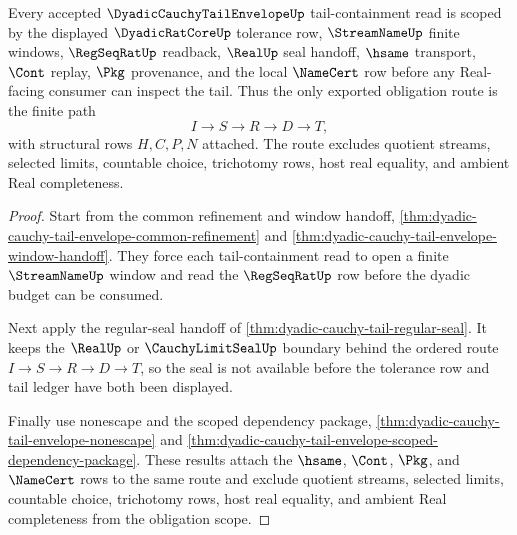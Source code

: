 \begin{theorem}
\label{thm:dyadic-cauchy-tail-obligation-scope}
Every accepted $\DyadicCauchyTailEnvelopeUp$ tail-containment read is scoped by the displayed $\DyadicRatCoreUp$ tolerance row, $\StreamNameUp$ finite windows, $\RegSeqRatUp$ readback, $\RealUp$ seal handoff, $\hsame$ transport, $\Cont$ replay, $\Pkg$ provenance, and the local $\NameCert$ row before any Real-facing consumer can inspect the tail. Thus the only exported obligation route is the finite path
$$
I \longrightarrow S \longrightarrow R \longrightarrow D \longrightarrow T ,
$$
with structural rows $H,C,P,N$ attached. The route excludes quotient streams, selected limits, countable choice, trichotomy rows, host real equality, and ambient Real completeness.
\end{theorem}
\begin{proof}
Start from the common refinement and window handoff, \autoref{thm:dyadic-cauchy-tail-envelope-common-refinement} and \autoref{thm:dyadic-cauchy-tail-envelope-window-handoff}. They force each tail-containment read to open a finite $\StreamNameUp$ window and read the $\RegSeqRatUp$ row before the dyadic budget can be consumed.

Next apply the regular-seal handoff of \autoref{thm:dyadic-cauchy-tail-regular-seal}. It keeps the $\RealUp$ or $\CauchyLimitSealUp$ boundary behind the ordered route $I \longrightarrow S \longrightarrow R \longrightarrow D \longrightarrow T$, so the seal is not available before the tolerance row and tail ledger have both been displayed.

Finally use nonescape and the scoped dependency package, \autoref{thm:dyadic-cauchy-tail-envelope-nonescape} and \autoref{thm:dyadic-cauchy-tail-envelope-scoped-dependency-package}. These results attach the $\hsame$, $\Cont$, $\Pkg$, and $\NameCert$ rows to the same route and exclude quotient streams, selected limits, countable choice, trichotomy rows, host real equality, and ambient Real completeness from the obligation scope.
\end{proof}

